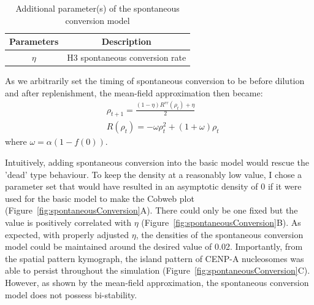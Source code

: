 \begin{table}[htbp]
\centering
\caption{Additional parameter(s) of the spontaneous conversion model}
\label{tab:parametersSpontaneousConversion}
\begin{tabular}{cl}
\hline
\textbf{Parameters} & \multicolumn{1}{c}{\textbf{Description}} \\ \hline
$\eta$                  & H3 spontaneous conversion rate     \\ \hline
\end{tabular}
\end{table}

As we arbitrarily set the timing of spontaneous conversion to be before dilution and after replenishment, the mean-field approximation then became: 
\begin{equation}\label{eq:9}
\begin{split}
            &\rho_{t+1} = \frac{(1 - \eta)R^{rr}(\rho_{t}) + \eta}{2}\\
            &R(\rho_{t}) = -\omega \rho_{t}^{2} + (1 + \omega) \rho_{t}
\end{split}
\end{equation}
where $\omega = \alpha(1 - f(0))$. 

Intuitively, adding spontaneous conversion into the basic model would rescue the 'dead' type behaviour. To keep the density at a reasonably low value, I chose a parameter set that would have resulted in an asymptotic density of 0 if it were used for the basic model to make the Cobweb plot (Figure~\ref{fig:spontaneousConversion}A). There could only be one fixed but the value is positively correlated with $\eta$ (Figure~\ref{fig:spontaneousConversion}B). As expected, with properly adjusted $\eta$, the densities of the spontaneous conversion model could be maintained around the desired value of 0.02. Importantly, from the spatial pattern kymograph, the island pattern of CENP-A nucleosomes was able to persist throughout the simulation (Figure~\ref{fig:spontaneousConversion}C). However, as shown by the mean-field approximation, the spontaneous conversion model does not possess bi-stability. 

